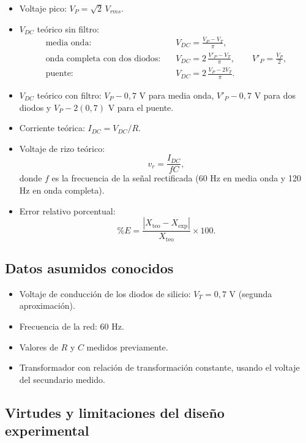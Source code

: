 \begin{itemize}
    \item Voltaje pico: $V_P = \sqrt{2}\,V_{rms}$.
    \item $V_{DC}$ teórico sin filtro:
    \[
        \begin{aligned}
            \text{media onda:}\quad
            &V_{DC} = \frac{V_P - V_T}{\pi},\\
            \text{onda completa con dos diodos:}\quad
            &V_{DC} = 2\,\frac{V'_P - V_T}{\pi},
            \qquad V'_P = \frac{V_P}{2},\\
            \text{puente:}\quad
            &V_{DC} = 2\,\frac{V_P - 2V_T}{\pi}.
        \end{aligned}
    \]
    \item $V_{DC}$ teórico con filtro: $V_P - 0{,}7$ V para media onda,
    $V'_P - 0{,}7$ V para dos diodos y $V_P - 2(0{,}7)$ V para el puente.
    \item Corriente teórica: $I_{DC} = V_{DC}/R$.
    \item Voltaje de rizo teórico:
    \[
        v_r = \frac{I_{DC}}{fC},
    \]
    donde $f$ es la frecuencia de la señal rectificada (60 Hz en media onda
    y 120 Hz en onda completa).
    \item Error relativo porcentual:
    \[
        \%E =
        \frac{|X_{\text{teo}} - X_{\text{exp}}|}{X_{\text{teo}}}
        \times 100.
    \]
\end{itemize}

\subsection{Datos asumidos conocidos}

\begin{itemize}
    \item Voltaje de conducción de los diodos de silicio:
    $V_T = 0{,}7$ V (segunda aproximación).
    \item Frecuencia de la red: 60 Hz.
    \item Valores de $R$ y $C$ medidos previamente.
    \item Transformador con relación de transformación constante, usando el
    voltaje del secundario medido.
\end{itemize}

\subsection{Virtudes y limitaciones del diseño experimental}

